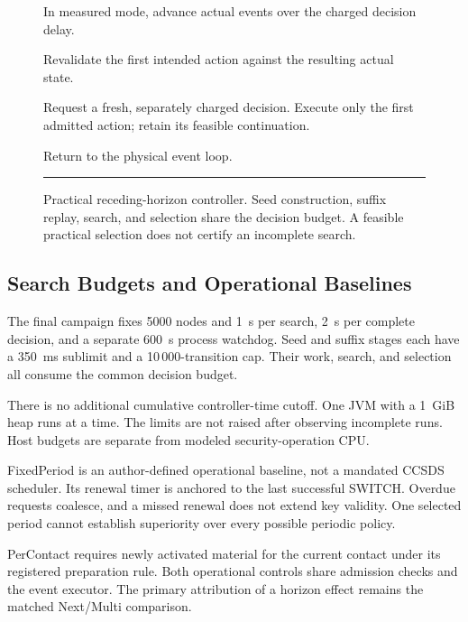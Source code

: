 \documentclass[conference]{IEEEtran}
\begin{document}
\begin{figure}[!t]
\begin{minipage}{0.98\columnwidth}
\begin{algorithmic}[1]
            \STATE In measured mode, advance actual events over
                   the charged decision delay.

            \STATE Revalidate the first intended action against
                   the resulting actual state.

                \STATE Request a fresh, separately charged decision.
            \ELSE
                \STATE Execute only the first admitted action;
                       retain its feasible continuation.
            \ENDIF

            \STATE Return to the physical event loop.
        \end{algorithmic}

        \vspace{4pt}
        \hrule
    \end{minipage}

    \caption{
        Practical receding-horizon controller.
        Seed construction, suffix replay, search, and selection
        share the decision budget.
        A feasible practical selection does not certify an
        incomplete search.
    }
    \label{fig:controller}
\end{figure}

\subsection{Search Budgets and Operational Baselines}

The final campaign fixes 5000 nodes and 1~s per search,
2~s per complete decision, and a separate 600~s process
watchdog.
Seed and suffix stages each have a 350~ms sublimit and
a 10\,000-transition cap.
Their work, search, and selection all consume the common
decision budget.

There is no additional cumulative controller-time cutoff.
One JVM with a 1~GiB heap runs at a time.
The limits are not raised after observing incomplete runs.
Host budgets are separate from modeled security-operation CPU.

FixedPeriod is an author-defined operational baseline,
not a mandated CCSDS scheduler.
Its renewal timer is anchored to the last successful SWITCH.
Overdue requests coalesce, and a missed renewal does not
extend key validity.
One selected period cannot establish superiority over every
possible periodic policy.

PerContact requires newly activated material for the current
contact under its registered preparation rule.
Both operational controls share admission checks and the
event executor.
The primary attribution of a horizon effect remains the
matched Next/Multi comparison.
\end{document}
